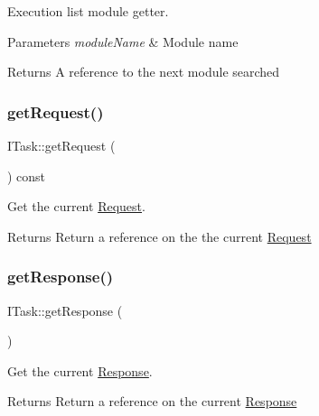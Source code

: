 Execution list module getter. 


\begin{DoxyParams}{Parameters}
{\em module\+Name} & Module name \\
\hline
\end{DoxyParams}
\begin{DoxyReturn}{Returns}
A reference to the next module searched 
\end{DoxyReturn}
\mbox{\label{classxzia_1_1ITask_aeac67e104b125e2a9c03ec8a3cd80296}} 
\subsubsection{\texorpdfstring{get\+Request()}{getRequest()}}
{\footnotesize\ttfamily I\+Task\+::get\+Request (\begin{DoxyParamCaption}{ }\end{DoxyParamCaption}) const\hspace{0.3cm}{\ttfamily [pure virtual]}}



Get the current \mbox{\hyperlink{structxzia_1_1Request}{Request}}. 

\begin{DoxyReturn}{Returns}
Return a reference on the the current \mbox{\hyperlink{structxzia_1_1Request}{Request}} 
\end{DoxyReturn}
\mbox{\label{classxzia_1_1ITask_a5bd63caed103f8bf8b6d76a9a802a927}} 
\subsubsection{\texorpdfstring{get\+Response()}{getResponse()}}
{\footnotesize\ttfamily I\+Task\+::get\+Response (\begin{DoxyParamCaption}{ }\end{DoxyParamCaption})\hspace{0.3cm}{\ttfamily [pure virtual]}}



Get the current \mbox{\hyperlink{structxzia_1_1Response}{Response}}. 

\begin{DoxyReturn}{Returns}
Return a reference on the current \mbox{\hyperlink{structxzia_1_1Response}{Response}} 
\end{DoxyReturn}
\mbox{\label{classxzia_1_1ITask_a10e224e38e770108abb3518c06156094}} 
